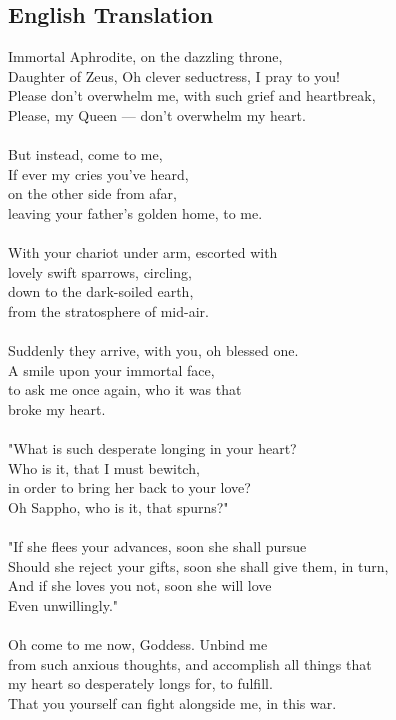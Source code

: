 \begin{multicols}{2}
  \columnbreak
  \subsection*{English Translation}
  Immortal Aphrodite, on the dazzling throne,\\
  Daughter of Zeus, Oh clever seductress, I pray to you!\\
  Please don't overwhelm me, with such grief and heartbreak,\\
  Please, my Queen --- don't overwhelm my heart.\\
  \\
  But instead, come to me,\\
  If ever my cries you've heard,\\
  on the other side from afar,\\
  leaving your father's golden home, to me.\\
  \\
  With your chariot under arm, escorted with\\
  lovely swift sparrows, circling,\\
  down to the dark-soiled earth,\\
  from the stratosphere of mid-air.\\
  \\
  Suddenly they arrive, with you, oh blessed one.\\
  A smile upon your immortal face,\\
  to ask me once again, who it was that\\
  broke my heart.\\
  \\
  "What is such desperate longing in your heart?\\
  Who is it, that I must bewitch,\\
  in order to bring her back to your love?\\
  Oh Sappho, who is it, that spurns?"\\
  \\
  "If she flees your advances, soon she shall pursue\\
  Should she reject your gifts, soon she shall give them, in turn,\\
  And if she loves you not, soon she will love\\
  Even unwillingly."\\
  \\
  Oh come to me now, Goddess. Unbind me\\
  from such anxious thoughts, and accomplish all things that\\
  my heart so desperately longs for, to fulfill.\\
  That you yourself can fight alongside me, in this war.
\end{multicols}

\restoregeometry
